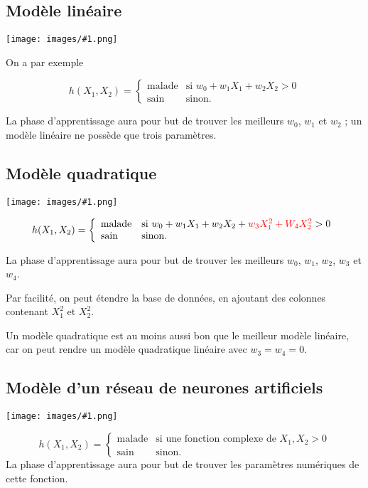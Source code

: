 \documentclass[10pt,a4paper]{report}
\newcommand{\dessin}[1]{\begin{center}\texttt{[image: images/\#1.png]}\end{center}}
\begin{document}
		\subsection{Modèle linéaire}
		
		\dessin{3}
		
		On a par exemple
		
		$$h(X_1, X_2) = \left\{
    \begin{array}{ll}
        \text{malade} & \text{si } w_0 + w_1X_1 + w_2X_2 > 0 \\
        \text{sain} & \text{sinon.}
    \end{array}
\right.$$

		La phase d'apprentissage aura pour but de trouver les meilleurs $w_0$, $w_1$ et $w_2$ ; un modèle linéaire ne possède que trois paramètres.
		
		\subsection{Modèle quadratique}
		\dessin{4}
		
		$$h(X_1, X_2) = \left\{
    \begin{array}{ll}
        \text{malade} & \text{si } w_0 + w_1X_1 + w_2X_2 + \textcolor{red}{w_3 X_1^2 + W_4X_2^2} > 0 \\
        \text{sain} & \text{sinon.}
    \end{array}
\right.$$

		La phase d'apprentissage aura pour but de trouver les meilleurs $w_0$, $w_1$, $w_2$, $w_3$ et $w_4$.
		
		Par facilité, on peut étendre la base de données, en ajoutant des colonnes contenant $X_1^2$ et $X_2^2$.
		
		Un modèle quadratique est au moins aussi bon que le meilleur modèle linéaire, car on peut rendre un modèle quadratique linéaire avec $w_3 = w_4 = 0$.


		\subsection{Modèle d'un réseau de neurones artificiels}
		\dessin{5}
		$$h(X_1, X_2) = \left\{
    \begin{array}{ll}
        \text{malade} & \text{si une fonction complexe de } X_1, X_2 > 0 \\
        \text{sain} & \text{sinon.}
    \end{array}
\right.$$
		La phase d'apprentissage aura pour but de trouver les paramètres numériques de cette fonction.
		
\end{document}
